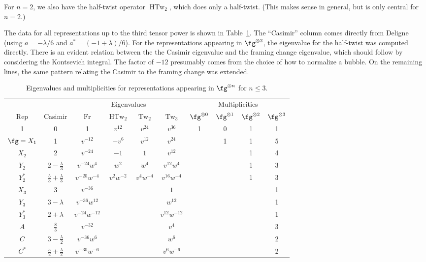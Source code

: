 \documentclass[12pt]{amsart}
\DeclareMathOperator{\Tw}{Tw}
\DeclareMathOperator{\HTw}{HTw}
\DeclareMathOperator{\Fr}{Fr}
\begin{document}
For $n=2$, we also have the half-twist operator $\HTw_2$, which does
only a half-twist. (This makes sense in general, but is only central
for $n=2$.)

The data for all representations up to the third tensor power is shown
in Table~\ref{tab:e-vals}. The ``Casimir'' column comes directly from
Deligne (using $a = -\lambda/6$ and $a^* = (-1+\lambda)/6$). For the
representations appearing in $\fg^{\otimes 2}$, the eigenvalue for the
half-twist was computed directly. There is an evident relation between
the the Casimir eigenvalue and the framing change eigenvalue, which
should follow by considering the Kontsevich integral. The factor of
$-12$ presumably comes from the choice of how to normalize a
bubble. On the remaining lines, the same pattern relating the Casimir
to the framing change was extended.

\begin{table}
  \centering
\medskip
\begin{tabular}{cccccccccc}
  \toprule
      &         &   \multicolumn{4}{c}{Eigenvalues}    & \multicolumn{4}{c}{Multiplicities} \\
  \cmidrule(lr){3-6} \cmidrule(l){7-10}
  Rep & Casimir & $\Fr$ & $\HTw_2$ & $\Tw_2$ & $\Tw_3$ & $\fg^{\otimes0}$ & $\fg^{\otimes1}$ & $\fg^{\otimes2}$ & $\fg^{\otimes3}$\\ \midrule
  1   & 0       & 1     & $v^{12}$ & $v^{24}$ & $v^{36}$
      & 1 & 0 & 1 & 1\\[3pt]
  $\fg=X_1$ & 1 & $v^{-12}$ & $-v^6$ & $v^{12}$ & $v^{24}$
      &   & 1 & 1 & 5\\[3pt]
  $X_2$ & 2     & $v^{-24}$ & $-1$ & $1$      & $v^{12}$
      &   &   & 1 & 4\\[3pt]
  $Y_2$ & $2 - \frac{\lambda}{3}$ & $v^{-24}w^4$ & $w^2$ & $w^4$ & $v^{12}w^4$
      &   &   & 1 & 3\\[3pt]
  $Y_2^*$ & $\frac{5}{3} + \frac{\lambda}{3}$ & $v^{-20}w^{-4}$ & $v^2 w^{-2}$ & $v^4 w^{-4}$ & $v^{16}w^{-4}$
      &   &   & 1 & 3\\[3pt]
  $X_3$ & $3$ & $v^{-36}$ & & & $1$ &&&& 1\\[3pt]
  $Y_3$ & $3 - \lambda$ & $v^{-36}w^{12}$ &&& $w^{12}$ &&&& 1\\[3pt]
  $Y_3^*$ & $2 + \lambda$ & $v^{-24}w^{-12}$ &&& $v^{12}w^{-12}$ &&&& 1\\[3pt]
  $A$ & $\frac{8}{3}$ & $v^{-32}$ &&& $v^4$ &&&& 3\\[3pt]
  $C$ & $3 - \frac{\lambda}{2}$ & $v^{-36}w^6$ &&& $w^6$ &&&& 2\\[3pt]
  $C^*$ & $\frac{5}{2} + \frac{\lambda}{2}$ & $v^{-30}w^{-6}$ &&& $v^6w^{-6}$ &&&& 2\\[3pt]
  \bottomrule
\end{tabular}
\medskip
\caption{Eigenvalues and multiplicities for representations appearing in $\fg^{\otimes n}$ for $n \le 3$.}
\label{tab:e-vals}
\end{table}
\end{document}
